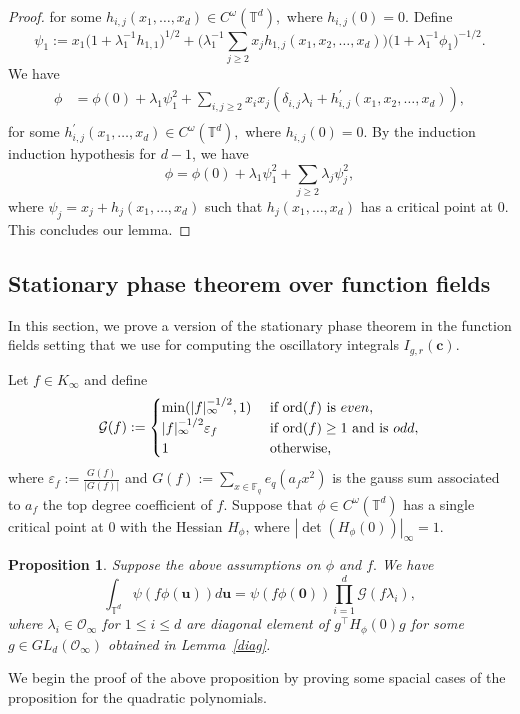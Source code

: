 \documentclass[11pt]{amsart}
\theoremstyle{plain}
\theoremstyle{plain}
\newtheorem{proposition}[theorem]{Proposition}
\renewcommand{\vec}[1]{\mathbf{#1}}
\theoremstyle{remark}
\theoremstyle{definition}
\newcommand{\ord}{\textup{ord}}
\newcommand{\TT}{\mathbb{T}}
\newcommand{\cO}{\mathcal{O}}
\newcommand{\cG}{\mathcal{G}}
\begin{document}
\begin{proof}
for some $h_{i,j}(x_1,\dots,x_d)\in C^{\omega}(\TT^d),$ where $h_{i,j}(0)=0.$
Define 
\[
\psi_1:=x_1\big(1+\lambda_1^{-1}h_{1,1}\big)^{1/2}+\big(\lambda_1^{-1}\sum_{j\geq 2}x_j h_{1,j}(x_1,x_2,\dots,x_d) \big)\big(1+\lambda_1^{-1}\phi_1\big)^{-1/2}.
\] We have 
\begin{equation}
\begin{split}
\phi&=\phi(0)+\lambda_1 \psi_1^2+\sum_{i,j\geq 2 }x_ix_j(\delta_{i,j}\lambda_i+h^{\prime}_{i,j}(x_1,x_2,\dots,x_d)),\\
\end{split}
\end{equation}
for some $h^{\prime}_{i,j}(x_1,\dots,x_d)\in C^{\omega}(\TT^d),$ where $h_{i,j}(0)=0.$ By the induction induction hypothesis for $d-1$, we have   
\[
\phi=\phi(0)+\lambda_1 \psi_1^2+\sum_{j\geq 2}\lambda_j \psi_j^2,
\]
where $\psi_{j}=x_j+h_j(x_1,\dots,x_d)$ such that $h_j(x_1,\dots,x_d)$ has a critical point at 0. 
This concludes our lemma. 
\end{proof}



\subsection{Stationary phase theorem over function fields}
In this section, we prove a version  of the stationary phase theorem in the function fields setting that we use for computing the oscillatory integrals $I_{g,r}(\vec{c})$.


 Let $f\in K_{\infty}$ and define  
 \begin{equation}\label{epsfact}
\cG(f):=\begin{cases}\min(|f|_{\infty}^{-1/2},1)   &\text{ if } \ord(f)\text{ is } even,
\\
|f|_{\infty}^{-1/2} \varepsilon_{f} &\text{ if } \ord(f)\geq 1\text{ and is } odd,
\\
1 &\text{ otherwise,}
\end{cases}
\end{equation}
where $\varepsilon_{f}:=\frac{G(f)}{|G(f)|}$ and  $G(f):=\sum_{x\in \mathbb{F}_q} e_q(a_f x^2)$ is the gauss sum associated to $a_f$ the top degree coefficient of $f.$ Suppose that $\phi\in C^{\omega}(\TT^d)$ has a single critical point at $0$ with the Hessian $H_{\phi}$, where $|\det(H_{\phi}(0))|_{\infty}=1.$
\begin{proposition}\label{station}
Suppose the above assumptions on $\phi$ and $f.$ We have
\[
\int_{\TT^d}\psi(f\phi(\vec{u}))d\vec{u}=\psi(f \phi(\vec{0})) \prod_{i=1}^{d}\cG (f\lambda_i),
\]
where $\lambda_i \in \cO_{\infty}$ for $1 \leq i\leq d$ are diagonal element of $g^{\intercal}H_{\phi}(0)g$ for some $g\in GL_d(\cO_{\infty})$ obtained in Lemma~\ref{diag}. 
\end{proposition}
We begin the proof of the above proposition by proving some spacial cases of the proposition for the quadratic polynomials. 
\end{document}
